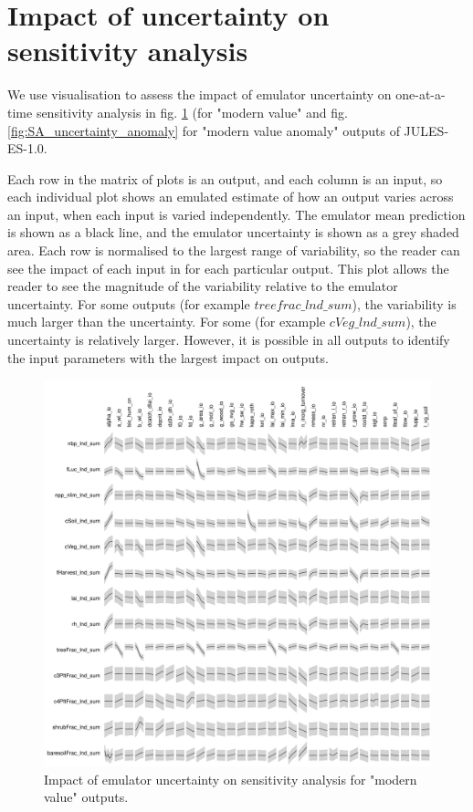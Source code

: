 \documentclass[gmd, manuscript]{copernicus}
\begin{document}
\clearpage


\section{Impact of uncertainty on sensitivity analysis}\label{app:sa_uncertainty}

We use visualisation to assess the impact of emulator uncertainty on one-at-a-time sensitivity analysis in fig. \ref{fig:SA_uncertainty} (for "modern value" and fig. \ref{fig:SA_uncertainty_anomaly} for "modern value anomaly" outputs of JULES-ES-1.0.

Each row in the matrix of plots is an output, and each column is an input, so each individual plot shows an emulated estimate of how an output varies across an input, when each input is varied independently. The emulator mean prediction is shown as a black line, and the emulator uncertainty is shown as a grey shaded area. Each row is normalised to the largest range of variability, so the reader can see the impact of each input in for each particular output. This plot allows the reader to see the magnitude of the variability relative to the emulator uncertainty. For some outputs (for example $treefrac\_lnd\_sum$), the variability is much larger than the uncertainty. For some (for example $cVeg\_lnd\_sum$), the uncertainty is relatively larger. However, it is possible in all outputs to identify the input parameters with the largest impact on outputs. 

\begin{figure}[ht]
\includegraphics[width=12cm]{./figs/figA07.pdf}
\caption{Impact of emulator uncertainty on sensitivity analysis for "modern value" outputs.}
\label{fig:SA_uncertainty}
\end{figure}
\end{document}
